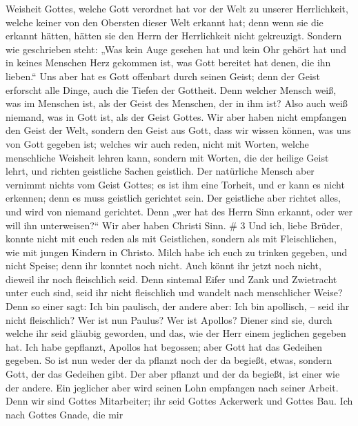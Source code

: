 Weisheit Gottes, welche Gott verordnet hat vor der Welt zu unserer
Herrlichkeit,  welche keiner von den Obersten dieser Welt
erkannt hat; denn wenn sie die erkannt hätten, hätten sie den Herrn der
Herrlichkeit nicht gekreuzigt.  Sondern wie geschrieben
steht: „Was kein Auge gesehen hat und kein Ohr gehört hat und in keines
Menschen Herz gekommen ist, was Gott bereitet hat denen, die ihn
lieben.``  Uns aber hat es Gott offenbart durch seinen
Geist; denn der Geist erforscht alle Dinge, auch die Tiefen der
Gottheit.  Denn welcher Mensch weiß, was im Menschen ist,
als der Geist des Menschen, der in ihm ist? Also auch weiß niemand, was
in Gott ist, als der Geist Gottes.  Wir aber haben nicht
empfangen den Geist der Welt, sondern den Geist aus Gott, dass wir
wissen können, was uns von Gott gegeben ist;  welches wir
auch reden, nicht mit Worten, welche menschliche Weisheit lehren kann,
sondern mit Worten, die der heilige Geist lehrt, und richten geistliche
Sachen geistlich.  Der natürliche Mensch aber vernimmt
nichts vom Geist Gottes; es ist ihm eine Torheit, und er kann es nicht
erkennen; denn es muss geistlich gerichtet sein.  Der
geistliche aber richtet alles, und wird von niemand gerichtet.
 Denn „wer hat des Herrn Sinn erkannt, oder wer will ihn
unterweisen?{}`` Wir aber haben Christi Sinn. \# 3  Und ich,
liebe Brüder, konnte nicht mit euch reden als mit Geistlichen, sondern
als mit Fleischlichen, wie mit jungen Kindern in Christo. 
Milch habe ich euch zu trinken gegeben, und nicht Speise; denn ihr
konntet noch nicht. Auch könnt ihr jetzt noch nicht, 
dieweil ihr noch fleischlich seid. Denn sintemal Eifer und Zank und
Zwietracht unter euch sind, seid ihr nicht fleischlich und wandelt nach
menschlicher Weise?  Denn so einer sagt: Ich bin paulisch,
der andere aber: Ich bin apollisch, -- seid ihr nicht fleischlich?
 Wer ist nun Paulus? Wer ist Apollos? Diener sind sie, durch
welche ihr seid gläubig geworden, und das, wie der Herr einem jeglichen
gegeben hat.  Ich habe gepflanzt, Apollos hat begossen; aber
Gott hat das Gedeihen gegeben.  So ist nun weder der da
pflanzt noch der da begießt, etwas, sondern Gott, der das Gedeihen gibt.
 Der aber pflanzt und der da begießt, ist einer wie der
andere. Ein jeglicher aber wird seinen Lohn empfangen nach seiner
Arbeit.  Denn wir sind Gottes Mitarbeiter; ihr seid Gottes
Ackerwerk und Gottes Bau.  Ich nach Gottes Gnade, die mir
